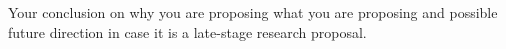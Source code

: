 Your conclusion on why you are proposing what you are proposing and possible future direction in case it is a late-stage research proposal.
